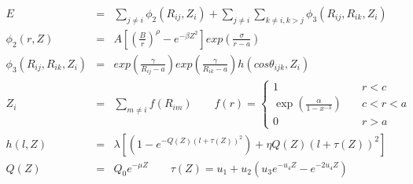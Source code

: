 \documentclass[12pt]{article}
\begin{document}
\begin{eqnarray*}
E & = & \sum_{j \ne i} \phi_{2}(R_{ij}, Z_{i}) + \sum_{j \ne i} \sum_{k \ne i,k > j} \phi_{3}(R_{ij}, R_{ik}, Z_{i}) \\
\phi_{2}(r, Z) & = & A\left[\left(\frac{B}{r}\right)^{\rho} - e^{-\beta Z^2}\right]exp{\left(\frac{\sigma}{r-a}\right)} \\
\phi_{3}(R_{ij}, R_{ik}, Z_i) & = & exp{\left(\frac{\gamma}{R_{ij}-a}\right)}exp{\left(\frac{\gamma}{R_{ik}-a}\right)}h(cos\theta_{ijk},Z_i) \\
Z_i & = & \sum_{m \ne i} f(R_{im}) \qquad
  f(r) = \begin{cases} 
         1 & \quad r<c \\
         \exp\left(\frac{\alpha}{1-x^{-3}}\right) & \quad c<r<a \\
         0 & \quad r>a
         \end{cases} \\
h(l,Z) & = & \lambda [(1-e^{-Q(Z)(l+\tau(Z))^2}) + \eta Q(Z)(l+\tau(Z))^2 ] \\
Q(Z) & = & Q_0 e^{-\mu Z} \qquad \tau(Z) = u_1 + u_2 (u_3 e^{-u_4 Z} - e^{-2u_4 Z})
\end{eqnarray*}
\end{document}
